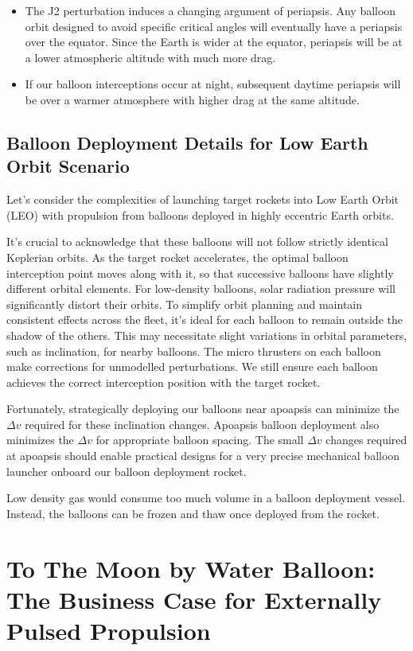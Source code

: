 \documentclass{article}
\begin{document}
{\begin{itemize}
\item The J2 perturbation induces a changing argument of periapsis. Any balloon orbit designed to avoid specific critical angles will eventually have a periapsis over the equator.  Since the Earth is wider at the equator, periapsis will be at a lower atmospheric altitude with much more drag.
\item If our balloon interceptions occur at night, subsequent daytime periapsis will be over a warmer atmosphere with higher drag at the same altitude.
\end{itemize}

\subsection{Balloon Deployment Details for Low Earth Orbit Scenario}
Let's consider the complexities of launching target rockets into Low Earth Orbit (LEO) with propulsion from balloons deployed in highly eccentric Earth orbits.

It's crucial to acknowledge that these balloons will not follow strictly identical Keplerian orbits. As the target rocket accelerates, the optimal balloon interception point moves along with it, so that successive balloons have slightly different orbital elements.
For low-density balloons, solar radiation pressure will significantly distort their orbits. To simplify orbit planning and maintain consistent  effects across the fleet, it's ideal for each balloon to remain outside the shadow of the others. This may necessitate slight variations in orbital parameters, such as inclination, for nearby balloons. The micro thrusters on each balloon  make corrections for unmodelled perturbations.  We still ensure each balloon achieves the correct interception position with the target rocket.   

Fortunately, strategically deploying our balloons near apoapsis can minimize the $\Delta v$ required for these inclination changes. Apoapsis balloon deployment also minimizes the $\Delta v$ for appropriate balloon spacing. The small $\Delta v$ changes required at apoapsis should enable practical designs for a very precise mechanical balloon launcher onboard our balloon deployment rocket.

Low density gas would consume too much volume in a balloon deployment vessel.   Instead, the balloons can be frozen and thaw once deployed from the rocket. 

\section{To The Moon by Water Balloon:  The Business Case for Externally Pulsed Propulsion}   

}
\end{document}
